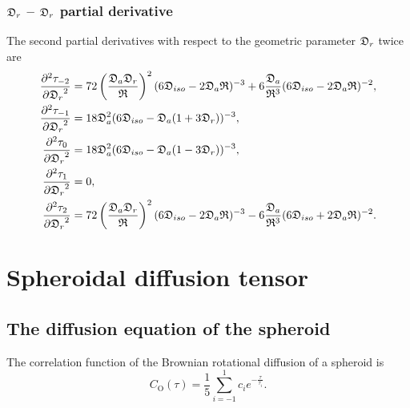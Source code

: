 \subsubsection{$\mathfrak{D}_r$ -- $\mathfrak{D}_r$ partial derivative}

The second partial derivatives with respect to the geometric parameter $\mathfrak{D}_r$ twice are
\begin{subequations}
\begin{align}
    \frac{\partial^2 \tau_{-2}}{{\partial \mathfrak{D}_r}^2} &=
        72 \left( \frac{\mathfrak{D}_a \mathfrak{D}_r}{\mathfrak{R}} \right)^2 (6\mathfrak{D}_{iso} - 2\mathfrak{D}_a\mathfrak{R})^{-3}
        + 6 \frac{\mathfrak{D}_a}{\mathfrak{R}^3} (6\mathfrak{D}_{iso} - 2\mathfrak{D}_a\mathfrak{R})^{-2}, \\
    \frac{\partial^2 \tau_{-1}}{{\partial \mathfrak{D}_r}^2} &= 18\mathfrak{D}_a^2 (6\mathfrak{D}_{iso} - \mathfrak{D}_a (1 + 3\mathfrak{D}_r))^{-3}, \\
    \frac{\partial^2 \tau_{0}}{{\partial \mathfrak{D}_r}^2}  &= 18\mathfrak{D}_a^2 (6\mathfrak{D}_{iso} - \mathfrak{D}_a (1 - 3\mathfrak{D}_r))^{-3}, \\
    \frac{\partial^2 \tau_{1}}{{\partial \mathfrak{D}_r}^2}  &= 0, \\
    \frac{\partial^2 \tau_{2}}{{\partial \mathfrak{D}_r}^2}  &= 
        72 \left( \frac{\mathfrak{D}_a \mathfrak{D}_r}{\mathfrak{R}} \right)^2 (6\mathfrak{D}_{iso} - 2\mathfrak{D}_a\mathfrak{R})^{-3}
        - 6 \frac{\mathfrak{D}_a}{\mathfrak{R}^3} (6\mathfrak{D}_{iso} + 2\mathfrak{D}_a\mathfrak{R})^{-2}.
\end{align}
\end{subequations}





\newpage
\section{Spheroidal diffusion tensor}





\subsection{The diffusion equation of the spheroid} \label{spheroid equation}

The correlation function of the Brownian rotational diffusion of a spheroid is
\begin{equation} \label{eq: spheroid correlation function}
    C_\mathrm{O}(\tau) = \frac{1}{5} \sum^1_{i=-1} c_i e^{-\frac{\tau}{\tau_i}}.
\end{equation}


